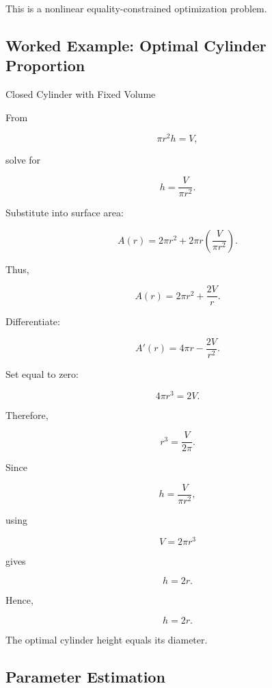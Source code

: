 This is a nonlinear equality-constrained optimization problem.

\subsection{Worked Example: Optimal Cylinder Proportion}
\label{subsec:worked-optimal-cylinder}

\begin{workedexamplebox}{Closed Cylinder with Fixed Volume}

From

\[
\pi r^2h=V,
\]

solve for

\[
h
=
\frac{
V
}{
\pi r^2
}.
\]

Substitute into surface area:

\[
A(r)
=
2\pi r^2
+
2\pi r
\left(
\frac{
V
}{
\pi r^2
}
\right).
\]

Thus,

\[
A(r)
=
2\pi r^2
+
\frac{
2V
}{
r
}.
\]

Differentiate:

\[
A'(r)
=
4\pi r
-
\frac{
2V
}{
r^2
}.
\]

Set equal to zero:

\[
4\pi r^3
=
2V.
\]

Therefore,

\[
r^3
=
\frac{
V
}{
2\pi
}.
\]

Since

\[
h
=
\frac{
V
}{
\pi r^2
},
\]

using

\[
V=2\pi r^3
\]

gives

\[
h=2r.
\]

Hence,

\begin{answerbox}
\[
\boxed{
h=2r.
}
\]

The optimal cylinder height equals its diameter.
\end{answerbox}

\end{workedexamplebox}

\subsection{Parameter Estimation}
\label{subsec:nlp-parameter-estimation}

